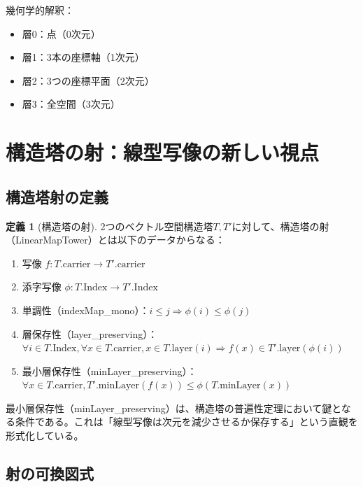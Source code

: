 \documentclass[11pt,a4paper]{ltjsarticle}
\theoremstyle{definition}
\newtheorem{definition}{定義}[section]
\newcommand{\minLayer}{\mathrm{minLayer}}
\begin{document}
幾何学的解釈：
\begin{itemize}
\item 層0：点（0次元）
\item 層1：3本の座標軸（1次元）
\item 層2：3つの座標平面（2次元）
\item 層3：全空間（3次元）
\end{itemize}

\section{構造塔の射：線型写像の新しい視点}

\subsection{構造塔射の定義}

\begin{definition}[構造塔の射]
\label{def:linear_map_tower}
2つのベクトル空間構造塔$T, T'$に対して、構造塔の射（LinearMapTower）とは以下のデータからなる：
\begin{enumerate}
\item 写像 $f: T.\text{carrier} \to T'.\text{carrier}$
\item 添字写像 $\phi: T.\text{Index} \to T'.\text{Index}$
\item 単調性（indexMap\_mono）：$i \leq j \Rightarrow \phi(i) \leq \phi(j)$
\item 層保存性（layer\_preserving）：\\
$\forall i \in T.\text{Index}, \forall x \in T.\text{carrier}, x \in T.\text{layer}(i) \Rightarrow f(x) \in T'.\text{layer}(\phi(i))$
\item 最小層保存性（minLayer\_preserving）：\\
$\forall x \in T.\text{carrier}, T'.\minLayer(f(x)) \leq \phi(T.\minLayer(x))$
\end{enumerate}
\end{definition}

\begin{tcolorbox}[colback=orange!5!white,colframe=orange!75!black,title=重要な観察]
最小層保存性（minLayer\_preserving）は、構造塔の普遍性定理において鍵となる条件である。これは「線型写像は次元を減少させるか保存する」という直観を形式化している。
\end{tcolorbox}

\subsection{射の可換図式}
\end{document}

